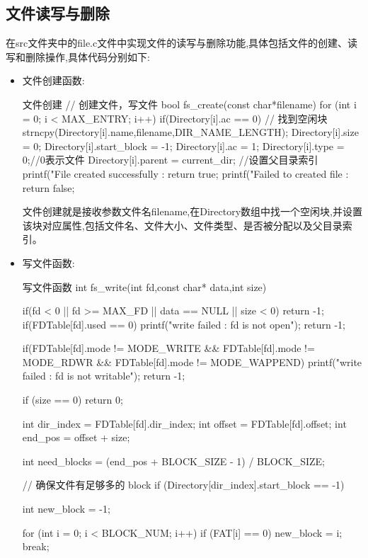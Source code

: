 \subsection{文件读写与删除}
在src文件夹中的file.c文件中实现文件的读写与删除功能,具体包括文件的创建、读写和删除操作,具体代码分别如下:
\begin{itemize}
    \item 文件创建函数:
    \begin{ccode}{文件创建}
// 创建文件，写文件
bool fs_create(const char*filename){
    for (int i = 0; i < MAX_ENTRY; i++){
        if(Directory[i].ac == 0){
            // 找到空闲块
            strncpy(Directory[i].name,filename,DIR_NAME_LENGTH);
            Directory[i].size = 0;
            Directory[i].start_block = -1;
            Directory[i].ac = 1; 
            Directory[i].type = 0;//0表示文件
            Directory[i].parent = current_dir; //设置父目录索引
            printf("File created successfully : %
            return true;
        }
    }
    printf("Failed to created file : %
    return false;
}
    \end{ccode}
    文件创建就是接收参数文件名filename,在Directory数组中找一个空闲块,并设置该块对应属性,包括文件名、文件大小、文件类型、是否被分配以及父目录索引。
    \item 写文件函数:
    \begin{ccode}{写文件函数}
int fs_write(int fd,const char* data,int size){
    if(fd < 0 || fd >= MAX_FD || data == NULL || size < 0) return -1;
    if(FDTable[fd].used == 0){
        printf("write failed : fd is not open\n");
        return -1;
    }

    if(FDTable[fd].mode != MODE_WRITE && FDTable[fd].mode != MODE_RDWR && FDTable[fd].mode != MODE_WAPPEND){
        printf("write failed : fd is not writable");
        return -1;
    }

    if (size == 0){
        return 0;
    }

    int dir_index = FDTable[fd].dir_index;
    int offset = FDTable[fd].offset;
    int end_pos = offset + size;

    int need_blocks = (end_pos + BLOCK_SIZE - 1) / BLOCK_SIZE;

    // 确保文件有足够多的 block
    if (Directory[dir_index].start_block == -1) {
        int new_block = -1;

        for (int i = 0; i < BLOCK_NUM; i++) {
            if (FAT[i] == 0) {
                new_block = i;
                break;
            }
        }

}}
\end{ccode}
\end{itemize}
